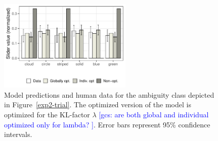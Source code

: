 \documentclass[11pt,a4paper]{article}
\newcommand{\gcs}[1]{\textcolor{blue}{[gcs: #1]}}
\begin{document}
\begin{figure}[ht]
	\centering
	\includegraphics[width=2.5in]{images/barplot_x3_withGlobal.pdf}
	\caption{Model predictions and human data for the ambiguity class depicted in Figure~\ref{exp2-trial}.
		The optimized version of the model is optimized for the KL-factor $\lambda$ \gcs{are both global and individual optimized only for lambda? }. Error bars represent 95\% confidence intervals.}\label{barplot_x3}
\end{figure}



\end{document}
